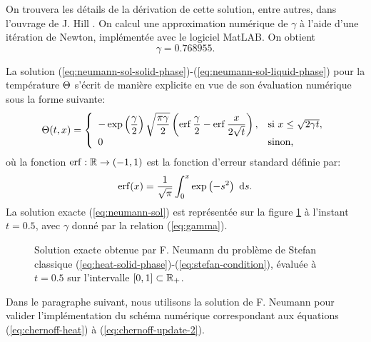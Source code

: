On trouvera les détails de la dérivation de cette solution, entre
autres, dans l'ouvrage de J. Hill \cite{HillStefanProblems}. On calcul
une approximation numérique de $\gamma$ à l'aide d'une itération de
Newton, implémentée avec le logiciel MatLAB\textregistered. On obtient
\begin{equation}\label{eq:gamma}
  \gamma =\num{0.768955}.
\end{equation}

La solution
(\ref{eq:neumann-sol-solid-phase})-(\ref{eq:neumann-sol-liquid-phase})
pour la température $\Theta$ s'écrit de manière explicite en vue
de son évaluation numérique sous la forme suivante:
\begin{equation}\label{eq:neumann-sol}
  \temperature(t, x) = \left\{
  \begin{array}{ll}
    -\exp\parent{\displaystyle\frac{\gamma}{2}}\sqrt{\displaystyle\frac{\pi\gamma}{2}} %
    \parent{\erf{\displaystyle\frac{\gamma}{2}} - \erf{\displaystyle\frac{x}{2\sqrt{t}}}}, %
    & \text{si } x \leq \sqrt{2\gamma t},\\
    0 %
    & \text{sinon,}
  \end{array}
  \right.
\end{equation}
où la fonction $\operatorname{erf}:\mathbb R\to(-1,1)$ est la fonction d'erreur
standard définie par:
\begin{equation}
  \operatorname{erf}(x) = \frac{1}{\sqrt \pi}\int_0^x \exp\left( -s^2 \right)\,\,\mathrm ds.
\end{equation}
La solution exacte (\ref{eq:neumann-sol}) est représentée sur la
figure \ref{fig:neumann-sol} à l'instant $t = 0.5$, avec $\gamma$
donné par la relation (\ref{eq:gamma}).

\begin{figure}
  \begin{center}
    
    \caption{Solution exacte obtenue par F. Neumann du problème de Stefan classique
      (\ref{eq:heat-solid-phase})-(\ref{eq:stefan-condition}), évaluée
      à $t = 0.5$ sur l'intervalle $[0,1]\subset \mathbb R_+$.}
    \label{fig:neumann-sol}
  \end{center}
\end{figure}

Dans le paragraphe suivant, nous utilisons la solution de F. Neumann
pour valider l'implémentation du schéma numérique correspondant aux
équations (\ref{eq:chernoff-heat}) à (\ref{eq:chernoff-update-2}).

